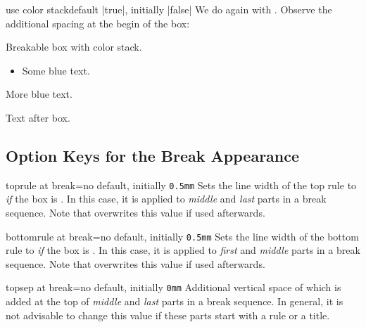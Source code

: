 \begin{docTcbKey}[][doc new=2020-10-09]{use color stack}{}{default |true|, initially |false|}
We do again with . Observe the additional spacing
at the begin of the box:

\begin{dispExample}
\begin{multicols}{2}\footnotesize
Breakable box with color stack.
\begin{tcolorbox}[enhanced jigsaw, use color stack,
  size=small, colframe=gray, colback=yellow!10!white, colupper=blue,
  enforce breakable,%
  vfill before first, pad at break=1mm, break at=3.3cm ]
    \begin{itemize}\item Some blue text.\end{itemize}
    {\color{red}\itshape\lipsum[2]}\par
    More blue text.
\end{tcolorbox}
Text after box.
\end{multicols}
\end{dispExample}

\end{docTcbKey}




\clearpage
\subsection{Option Keys for the Break Appearance}

\begin{docTcbKey}{toprule at break}{=}{no default, initially \texttt{0.5mm}}
  Sets the line width of the top rule to  \emph{if} the box is .
  In this case, it is applied to \emph{middle} and \emph{last} parts in a
  break sequence. Note that  overwrites this value
  if used afterwards.
\end{docTcbKey}


\begin{docTcbKey}{bottomrule at break}{=}{no default, initially \texttt{0.5mm}}
  Sets the line width of the bottom rule to  \emph{if} the box is .
  In this case, it is applied to \emph{first} and \emph{middle} parts in a
  break sequence. Note that  overwrites this value
  if used afterwards.
\end{docTcbKey}


\begin{docTcbKey}{topsep at break}{=}{no default, initially \texttt{0mm}}
  Additional vertical space of  which is added at the top of
  \emph{middle} and \emph{last} parts in a break sequence. In general,
  it is not advisable to change this value if these parts start with a rule or a title.
\end{docTcbKey}

